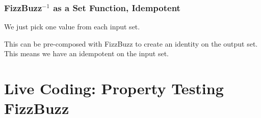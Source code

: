 \documentclass{beamer}
\begin{document}
\begin{frame}[fragile]
\frametitle{FizzBuzz{$^{-1}$} as a Set Function, Idempotent}

We just pick one value from each input set.

\medskip

This can be pre-composed with FizzBuzz to create an identity on the output set. \\
This means we have an idempotent on the input set. 

\end{frame}

\section{Live Coding: Property Testing FizzBuzz}
\end{document}
